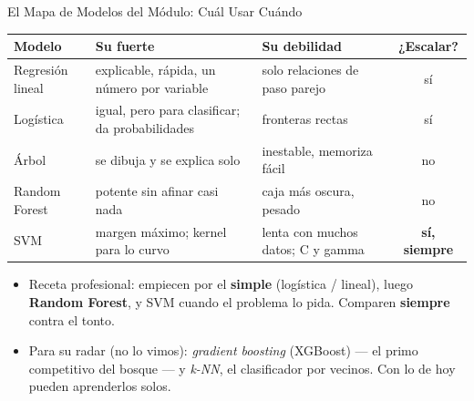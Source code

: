 \documentclass[aspectratio=169, 11pt]{beamer}
\begin{document}
\begin{frame}[shrink=12]{El Mapa de Modelos del Módulo: Cuál Usar Cuándo}
  \vspace{-4pt}
  {\footnotesize
  \begin{tabular}{@{}lp{4.6cm}p{4.6cm}c@{}}
    \toprule
    {\color{arcaDark}\bfseries Modelo} & {\color{arcaDark}\bfseries Su fuerte} &
    {\color{arcaDark}\bfseries Su debilidad} & {\color{arcaDark}\bfseries ¿Escalar?} \\
    \midrule
    Regresión lineal & explicable, rápida, un número por variable
      & solo relaciones de paso parejo & sí \\
    Logística & igual, pero para clasificar; da probabilidades
      & fronteras rectas & sí \\
    Árbol & se dibuja y se explica solo & inestable, memoriza fácil & no \\
    Random Forest & potente sin afinar casi nada & caja más oscura, pesado
      & no \\
    SVM & margen máximo; kernel para lo curvo & lenta con muchos datos;
      C y gamma & \textbf{sí, siempre} \\
    \bottomrule
  \end{tabular}
  }

  \vspace{8pt}
  {\footnotesize\color{textMuted}
  \begin{itemize}\setlength{\itemsep}{3pt}
    \item[{\color{arcaRed}\scriptsize\faArrowRight}]
      Receta profesional: empiecen por el \textbf{simple} (logística / lineal),
      luego \textbf{Random Forest}, y SVM cuando el problema lo pida.
      Comparen \textbf{siempre} contra el tonto.
    \item[{\color{arcaRed}\scriptsize\faForward}]
      Para su radar (no lo vimos): \emph{gradient boosting} (XGBoost) ---
      el primo competitivo del bosque --- y \emph{k-NN}, el clasificador por
      vecinos. Con lo de hoy pueden aprenderlos solos.
  \end{itemize}
  }
\end{frame}
\end{document}
